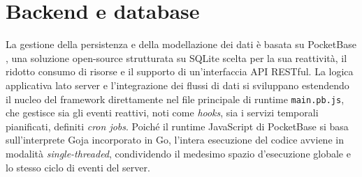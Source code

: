 \documentclass[12pt,a4paper]{article}
\begin{document}
\section{Backend e database}

La gestione della persistenza e della modellazione dei dati è basata su PocketBase \cite{pocketbase},
una soluzione open-source strutturata su SQLite scelta per la sua reattività, 
il ridotto consumo di risorse e il supporto di un'interfaccia API RESTful. 
La logica applicativa lato server e l'integrazione dei flussi di dati si sviluppano estendendo 
il nucleo del framework direttamente nel file principale di runtime \texttt{main.pb.js}, 
che gestisce sia gli eventi reattivi, noti come \textit{hooks}, sia i servizi temporali pianificati, definiti \textit{cron jobs}.
Poiché il runtime JavaScript di PocketBase si basa sull'interprete Goja incorporato in Go, 
l'intera esecuzione del codice avviene in modalità \textit{single-threaded}, 
condividendo il medesimo spazio d'esecuzione globale e lo stesso ciclo di eventi del server.
\end{document}
